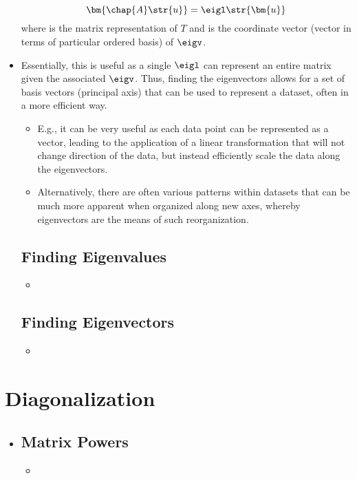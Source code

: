 \begin{itemize}
  \[%
  \bm{\chap{A}\str{u}} = \eigl \str{\bm{u}}
  \]%
  where  is the matrix representation of \(T\) and  is the coordinate vector (vector in terms of particular ordered basis) of \(\eigv \).
  \item Essentially, this is useful as a single  \(\eigl \) can represent an entire matrix  given the associated  \(\eigv \). Thus, finding the eigenvectors allows for a set of basis vectors (principal axis) that can be used to represent a dataset, often in a more efficient way.
    \begin{itemize}
      \item E.g., it can be very useful as each data point can be represented as a vector, leading to the application of a linear transformation that will not change direction of the data, but instead efficiently scale the data along the eigenvectors.
      \item Alternatively, there are often various patterns within datasets that can be much more apparent when organized along new axes, whereby eigenvectors are the means of such reorganization.
    \end{itemize}

  \subsection{Finding Eigenvalues}\label{Eigenvalues}
  \begin{itemize}
    \item 
  \end{itemize}
  

  \subsection{Finding Eigenvectors}\label{Eigenvectors}
  \begin{itemize}
    \item 
  \end{itemize}
  
\end{itemize}


\section{Diagonalization}\label{Diagonalization}
\begin{itemize}
  \item []
  
  \subsection{Matrix Powers}\label{Matrix Powers}
  \begin{itemize}
    \item 
  \end{itemize}
  
\end{itemize}

